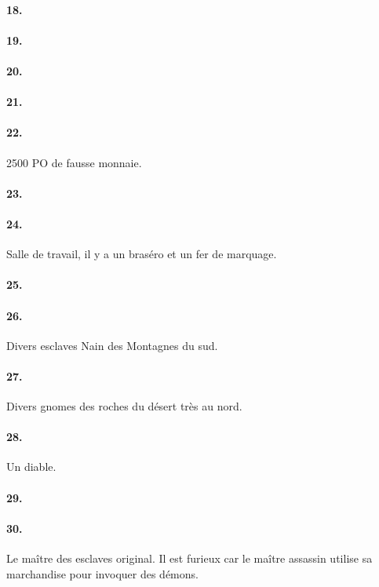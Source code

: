 \paragraph{18. }
\paragraph{19. }
\paragraph{20. }
\paragraph{21. }


\paragraph{22. }
2500 PO de fausse monnaie.

\paragraph{23. }
\paragraph{24. }
Salle de travail, il y a un braséro et un fer de marquage. 

\paragraph{25. }
\paragraph{26. }
Divers esclaves Nain des Montagnes du sud.

\paragraph{27. }
Divers gnomes des roches du désert très au nord.

\paragraph{28. }
Un diable.

\paragraph{29. }
\paragraph{30. }
Le maître des esclaves original. Il est furieux car le maître assassin utilise 
sa marchandise pour invoquer des démons.


